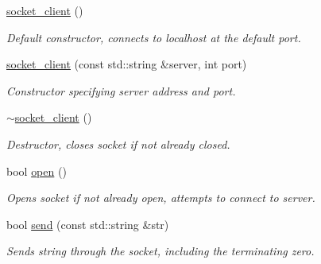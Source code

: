 \begin{DoxyCompactItemize}
\item 
\mbox{\label{classcpen333_1_1process_1_1windows_1_1socket__client_a276d574007dc6854a97e8ac90b672a24}} 
\hyperlink{classcpen333_1_1process_1_1windows_1_1socket__client_a276d574007dc6854a97e8ac90b672a24}{socket\+\_\+client} ()
\begin{DoxyCompactList}\small\item\em Default constructor, connects to localhost at the default port. \end{DoxyCompactList}\item 
\hyperlink{classcpen333_1_1process_1_1windows_1_1socket__client_a10222f217adb7ad265d973f252c5d528}{socket\+\_\+client} (const std\+::string \&server, int port)
\begin{DoxyCompactList}\small\item\em Constructor specifying server address and port. \end{DoxyCompactList}\item 
\mbox{\label{classcpen333_1_1process_1_1windows_1_1socket__client_aa87d6ad167eddf59a4be029bd9970fd8}} 
\hyperlink{classcpen333_1_1process_1_1windows_1_1socket__client_aa87d6ad167eddf59a4be029bd9970fd8}{$\sim$socket\+\_\+client} ()
\begin{DoxyCompactList}\small\item\em Destructor, closes socket if not already closed. \end{DoxyCompactList}\item 
bool \hyperlink{classcpen333_1_1process_1_1windows_1_1socket__client_a8cddf32b50ea156505f17e3a69d2a0d9}{open} ()
\begin{DoxyCompactList}\small\item\em Opens socket if not already open, attempts to connect to server. \end{DoxyCompactList}\item 
bool \hyperlink{classcpen333_1_1process_1_1windows_1_1socket__client_a1407cc219cf5c4295fc0b6efbd42191a}{send} (const std\+::string \&str)
\begin{DoxyCompactList}\small\item\em Sends string through the socket, including the terminating zero. \end{DoxyCompactList}\item 

\end{DoxyCompactItemize}
